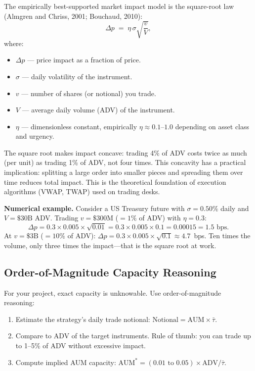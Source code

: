 The empirically best-supported market impact model is the square-root law (Almgren and Chriss, 2001; Bouchaud, 2010):
\begin{equation}
\label{eq:sqrt-impact}
\Delta p \;=\; \eta \,\sigma \sqrt{\frac{v}{V}},
\end{equation}
where:
\begin{itemize}[nosep]
  \item $\Delta p$ --- price impact as a fraction of price.
  \item $\sigma$ --- daily volatility of the instrument.
  \item $v$ --- number of shares (or notional) you trade.
  \item $V$ --- average daily volume (ADV) of the instrument.
  \item $\eta$ --- dimensionless constant, empirically $\eta \approx 0.1$--$1.0$ depending on asset class and urgency.
\end{itemize}
The square root makes impact concave: trading 4\% of ADV costs twice as much (per unit) as trading 1\% of ADV, not four times.  This concavity has a practical implication: splitting a large order into smaller pieces and spreading them over time reduces total impact.  This is the theoretical foundation of execution algorithms (VWAP, TWAP) used on trading desks.

\textbf{Numerical example.}  Consider a US Treasury future with $\sigma = 0.50\%$ daily and $V = \$30\text{B}$ ADV.  Trading $v = \$300\text{M}$ ($= 1\%$ of ADV) with $\eta = 0.3$:
\[
\Delta p = 0.3 \times 0.005 \times \sqrt{0.01} = 0.3 \times 0.005 \times 0.1 = 0.00015 = 1.5\text{~bps}.
\]
At $v = \$3\text{B}$ ($= 10\%$ of ADV): $\Delta p = 0.3 \times 0.005 \times \sqrt{0.1} \approx 4.7$~bps.  Ten times the volume, only three times the impact---that is the square root at work.

\subsection{Order-of-Magnitude Capacity Reasoning}

For your project, exact capacity is unknowable.  Use order-of-magnitude reasoning:

\begin{enumerate}[nosep]
  \item Estimate the strategy's daily trade notional: $\text{Notional} = \text{AUM} \times \bar{\tau}$.
  \item Compare to ADV of the target instruments.  Rule of thumb: you can trade up to 1--5\% of ADV without excessive impact.
  \item Compute implied AUM capacity: $\text{AUM}^* = (0.01 \text{ to } 0.05) \times \text{ADV} / \bar{\tau}$.
\end{enumerate}

